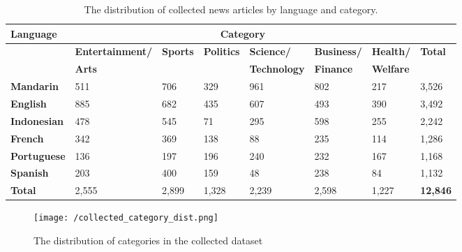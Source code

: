 \documentclass{l4proj}
\begin{document}
\begin{table}[]
\begin{tabular}{llllllll}
\hline
\textbf{Language}   & \multicolumn{6}{c}{\textbf{Category}}                                                                                       &                 \\ \hline
\textbf{}           & \textbf{Entertainment/} & \textbf{Sports} & \textbf{Politics} & \textbf{Science/}     & \textbf{Business/} & \textbf{Health/}   & \textbf{Total}  \\
\textbf{}           & \textbf{Arts}         & \textbf{}       & \textbf{}         & \textbf{Technology} & \textbf{Finance} & \textbf{Welfare} & \textbf{}       \\ \hline
\textbf{Mandarin}   & 511                    & 706             & 329               & 961                  & 802               & 217               & 3,526           \\
\textbf{English}    & 885                    & 682             & 435               & 607                  & 493               & 390               & 3,492           \\
\textbf{Indonesian} & 478                    & 545             & 71                & 295                  & 598               & 255               & 2,242           \\
\textbf{French}     & 342                    & 369             & 138               & 88                   & 235               & 114               & 1,286           \\
\textbf{Portuguese} & 136                    & 197             & 196               & 240                  & 232               & 167               & 1,168           \\
\textbf{Spanish}    & 203                    & 400             & 159               & 48                   & 238               & 84                & 1,132           \\ \hline
\textbf{Total}      & 2,555                  & 2,899           & 1,328             & 2,239                & 2,598             & 1,227             & \textbf{12,846}
\\ \hline
\end{tabular}
\caption{The distribution of collected news articles by language and category.}
\label{table:collectedstats}
\end{table}

\begin{figure}[h]
\texttt{[image: /collected\_category\_dist.png]}
\caption{The distribution of categories in the collected dataset}
\label{fig:collected_cat_dist}
\end{figure}
\end{document}
